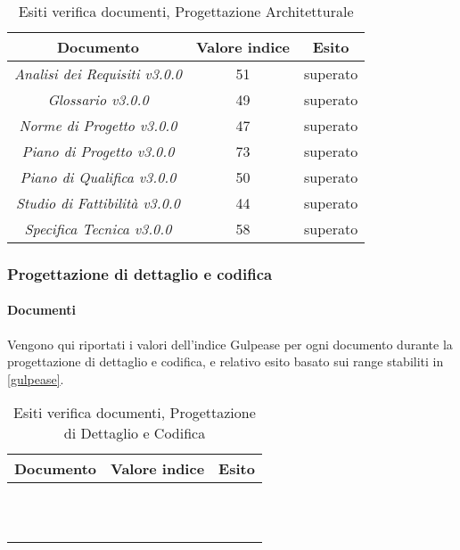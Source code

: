 	\begin{table}[H]
	\centering
	\begin{tabular}{ | c | c | c | }
    \hline
    Documento & Valore indice & Esito \\ \hline
    \emph{Analisi dei Requisiti v3.0.0} & 51 &  superato \\ \hline
    \emph{Glossario v3.0.0} & 49 &  superato \\ \hline
    \emph{Norme di Progetto v3.0.0} & 47 &  superato \\ \hline
    \emph{Piano di Progetto v3.0.0} & 73 &  superato \\ \hline
    \emph{Piano di Qualifica v3.0.0} & 50 &  superato \\ \hline
    \emph{Studio di Fattibilità v3.0.0} & 44 &  superato \\ \hline
    \emph{Specifica Tecnica v3.0.0} & 58 & superato \\ \hline
    \end{tabular}
	\caption{Esiti verifica documenti, Progettazione Architetturale}
	\end{table}
	

	\subsubsection{Progettazione di dettaglio e codifica}
	\paragraph{Documenti}
	 Vengono qui riportati i valori dell’indice Gulpease per ogni documento durante la progettazione di dettaglio e codifica, e relativo esito basato sui range stabiliti in \ref{gulpease}.
	
	\begin{table}[H]
	\centering
	\begin{tabular}{ | c | c | c | }
    \hline
    Documento & Valore indice & Esito \\ \hline
    \AnalisiDeiRequisiti{} &  &   \\ \hline
    \DefinizioneDiProdotto{} &  &   \\ \hline
    \Glossario{} &  &   \\ \hline
    \ManualeAdmin{} &  &   \\ \hline
    \ManualeSviluppatore{} &  &   \\ \hline
    \ManualeUtente{} &  &   \\ \hline
    \NormeDiProgetto{} &  &   \\ \hline
    \PianoDiProgetto{} &  &   \\ \hline
    \PianoDiQualifica{} &  &   \\ \hline
    \SpecificaTecnica{} &  &  \\ \hline
    \StudioDiFattibilita{} &  &   \\ \hline
    \end{tabular}
	\caption{Esiti verifica documenti, Progettazione di Dettaglio e Codifica}
	\end{table}

